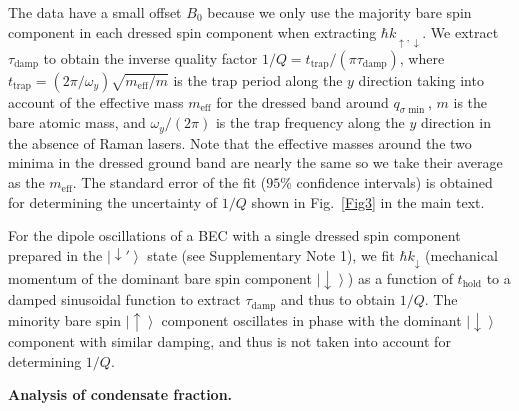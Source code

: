 \documentclass[showpacs,preprintnumbers,amsmath,amssymb, superscriptaddress, aps, reprint]{revtex4-1}
\def\thold{t_{\text{hold}}}
\begin{document}
{{{{The data have a small offset $B_0$ because we only use the majority bare spin component in each dressed spin component when extracting $\hbar k_{\uparrow, \downarrow}$.} 
We extract ${\tau_{\text{damp}}}$ to obtain the inverse quality factor $1/Q = {t_{\text{trap}}}/(\pi {\tau_{\text{damp}}})$, where ${t_{\text{trap}}} = (2\pi /{\omega _y})\sqrt {{m_{\text{eff}}}/m} $ is the trap period along the $y$ direction taking into account of the effective mass ${m_{\text{eff}}}$ for the dressed band around $q_{\sigma\min}$, $m$ is the bare atomic mass, and ${\omega _y}/(2\pi )$ is the trap frequency along the $y$ direction in the absence of Raman lasers. Note that the effective masses around the two minima in the dressed ground band are nearly the same so we take their average as the ${m_{\text{eff}}}$. The standard error of the fit ($95$\% confidence intervals) is obtained for determining the uncertainty of $1/Q$ shown in Fig.~\ref{Fig3} in the main text.

For the dipole oscillations of a BEC with a single dressed spin component prepared in the $\left| { \downarrow '} \right\rangle$ state (see Supplementary Note 1), we fit $\hbar {k_ \downarrow }$ (mechanical momentum of the dominant bare spin component $\left|  \downarrow  \right\rangle$) as a function of $\thold$ to a damped sinusoidal function to extract $\tau_{\text{damp}}$ and thus to obtain $1/Q$. The minority bare spin $\left| \uparrow\right\rangle$ component oscillates in phase with the dominant $\left| \downarrow\right\rangle$ component with similar damping, and thus is not taken into account for determining $1/Q$.

\vspace{5mm}

\textbf{Analysis of condensate fraction.}

}}}
\end{document}
